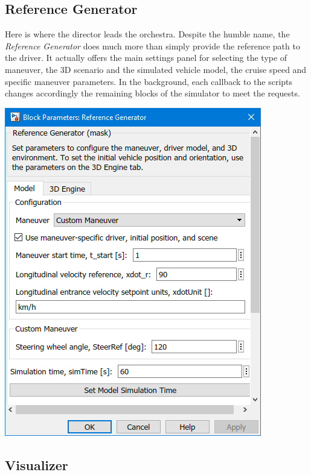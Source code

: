 		\subsection{Reference Generator}

		Here is where the director leads the orchestra. Despite the humble name, the \emph{Reference Generator} does much more than simply provide the reference path
		to the driver. It actually offers the main settings panel for selecting the type of maneuver, the 3D scenario and the simulated vehicle model, the cruise speed and specific
		maneuver parameters. In the background, each callback to the scripts changes accordingly the remaining blocks of the simulator to meet the requests.
		\begin{center}
			\includegraphics[height=0.3\textheight]{Images/Simulator/sim-refgen-cfg}
		\end{center}


		\subsection{Visualizer}

